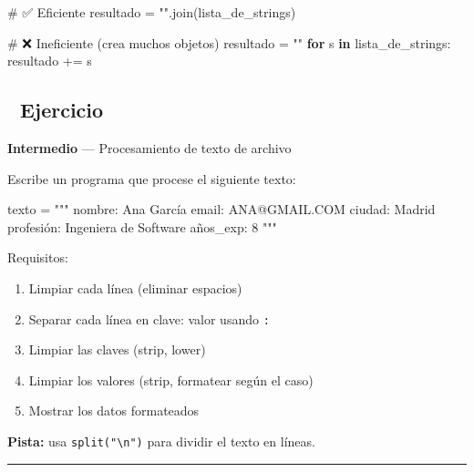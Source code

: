 \documentclass[
  doc,
  floatsintext,
  longtable,
  a4paper,
  nolmodern,
  notxfonts,
  notimes,
  12pt,
  colorlinks=true,linkcolor=blue,citecolor=blue,urlcolor=blue]{apa7}
\newenvironment{Shaded}{\begin{snugshade}}{\end{snugshade}}
\newcommand{\CommentTok}[1]{\textcolor[rgb]{0.37,0.37,0.37}{#1}}
\newcommand{\ControlFlowTok}[1]{\textcolor[rgb]{0.00,0.23,0.31}{\textbf{#1}}}
\newcommand{\KeywordTok}[1]{\textcolor[rgb]{0.00,0.23,0.31}{\textbf{#1}}}
\newcommand{\NormalTok}[1]{\textcolor[rgb]{0.00,0.23,0.31}{#1}}
\newcommand{\OperatorTok}[1]{\textcolor[rgb]{0.37,0.37,0.37}{#1}}
\newcommand{\StringTok}[1]{\textcolor[rgb]{0.13,0.47,0.30}{#1}}
\providecommand{\tightlist}{%
  \setlength{\itemsep}{0pt}\setlength{\parskip}{0pt}}
\begin{document}
\begin{enumerate}
\begin{Shaded}
\begin{Highlighting}[]
\CommentTok{\# ✅ Eficiente}
\NormalTok{resultado }\OperatorTok{=} \StringTok{""}\NormalTok{.join(lista\_de\_strings)}

\CommentTok{\# ❌ Ineficiente (crea muchos objetos)}
\NormalTok{resultado }\OperatorTok{=} \StringTok{""}
\ControlFlowTok{for}\NormalTok{ s }\KeywordTok{in}\NormalTok{ lista\_de\_strings:}
\NormalTok{    resultado }\OperatorTok{+=}\NormalTok{ s}
\end{Highlighting}
\end{Shaded}
\end{enumerate}

\subsection{📝 Ejercicio}\label{ejercicio}

\textbf{Intermedio} --- Procesamiento de texto de archivo

Escribe un programa que procese el siguiente texto:

\begin{Shaded}
\begin{Highlighting}[]
\NormalTok{texto }\OperatorTok{=} \StringTok{"""}
\StringTok{  nombre: Ana García  }
\StringTok{  email: ANA@GMAIL.COM  }
\StringTok{  ciudad:  Madrid   }
\StringTok{  profesión:  Ingeniera de Software  }
\StringTok{  años\_exp:  8  }
\StringTok{"""}
\end{Highlighting}
\end{Shaded}

Requisitos:

\begin{enumerate}
\def\labelenumi{\arabic{enumi}.}
\tightlist
\item
  Limpiar cada línea (eliminar espacios)
\item
  Separar cada línea en clave: valor usando \texttt{:}
\item
  Limpiar las claves (strip, lower)
\item
  Limpiar los valores (strip, formatear según el caso)
\item
  Mostrar los datos formateados
\end{enumerate}

\textbf{Pista:} usa \texttt{split("\textbackslash{}n")} para dividir el
texto en líneas.

\begin{center}\rule{0.5\linewidth}{0.5pt}\end{center}
\end{document}
